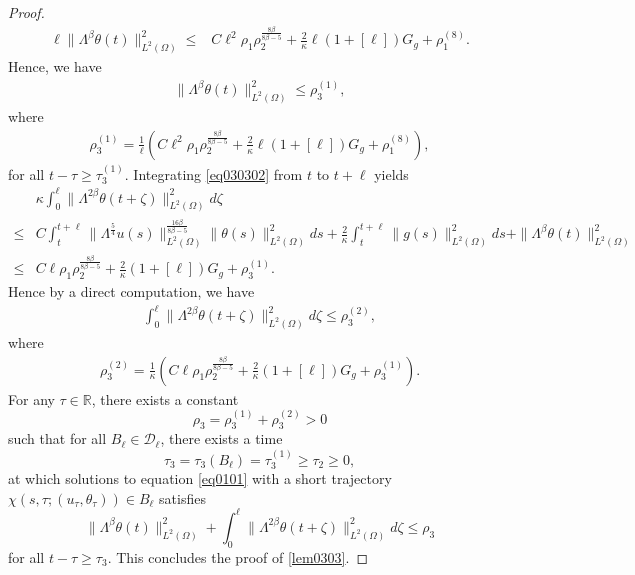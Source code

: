 \documentclass[oneside,preprint,12pt,numbers,sort&compress]{elsarticle}
\begin{document}
\begin{proof}
\begin{align*}
  \ell\|\Lambda^{\beta}\theta(t)\|_{L^2(\Omega)}^2 
  \leq&C\ell^{2}\rho_{1}\rho_{2}^{\frac{8\beta}{8\beta-5}}
  +\frac{2}{\kappa}\ell(1+[\ell])G_{g} +\rho_{1}^{(8)}.
\end{align*}
Hence, we have 
\begin{align}\label{eq030305}
  \|\Lambda^{\beta}\theta(t)\|_{L^2(\Omega)}^2 
  \leq \rho_{3}^{(1)},
\end{align}
where
\begin{align*}
  \rho_{3}^{(1)}
  =
  \frac{1}{\ell}
  \left( C\ell^{2}\rho_{1}\rho_{2}^{\frac{8\beta}{8\beta-5}}
  +\frac{2}{\kappa}\ell(1+[\ell])G_{g} +\rho_{1}^{(8)}
  \right),
\end{align*}
for all $t-\tau \geq \tau_{3}^{(1)}$.
Integrating \cref{eq030302} from $t$ to $t+\ell$ yields
\begin{align*}
  & \kappa\int_{0}^{\ell}\|\Lambda^{2\beta} \theta(t+\zeta)\|_{L^2(\Omega)}^2 d\zeta \\
  \leq & C
  \int_{t}^{t+\ell}
   \|\Lambda^{\frac{5}{4}}u(s)\|_{L^{2}(\Omega)}^{\frac{16\beta}{8\beta-5}}
   \|\theta(s)\|_{L^{2}(\Omega)}^{2} ds
   +\frac{2}{\kappa}
   \int_{t}^{t+\ell}\|g(s)\|_{L^2(\Omega)}^{2} ds
   +\|\Lambda^{\beta}\theta(t)\|_{L^2(\Omega)}^2 \\
  \leq & C \ell
  \rho_{1}\rho_{2}^{\frac{8\beta}{8\beta-5}}
   +\frac{2}{\kappa}(1+[\ell])G_{g} 
   +\rho_{3}^{(1)}.
\end{align*}
Hence by a direct computation, we have
\begin{align}\label{eq030306}
 \int_{0}^{\ell}\|\Lambda^{2\beta} \theta(t+\zeta)\|_{L^2(\Omega)}^2 d\zeta \leq \rho_{3}^{(2)},
\end{align}
where
\begin{align*}
   \rho_{3}^{(2)} = \frac{1}{\kappa} \left( C \ell
  \rho_{1}\rho_{2}^{\frac{8\beta}{8\beta-5}}
   +\frac{2}{\kappa}(1+[\ell])G_{g} 
   +\rho_{3}^{(1)} \right).
\end{align*}
For any $\tau \in \mathbb{R}$, there exists a constant 
$$
\rho_3=\rho_{3}^{(1)}+\rho_{3}^{(2)}>0
$$
such that for all $B_{\ell} \in \mathcal{D}_{\ell}$, there exists a time 
$$
\tau_3 =\tau_3(B_{\ell})=\tau_{3}^{(1)} \geq \tau_{2}\geq 0 ,
$$
at which solutions to equation \cref{eq0101} with a short trajectory $\chi(s,\tau; (u_\tau, \theta_\tau)) \in B_{\ell}$ satisfies 
\[
\| \Lambda^{\beta} \theta(t)\|_{L^2(\Omega)}^{2}
+ \int_{0}^{\ell} \| \Lambda^{2\beta} \theta(t+\zeta) \|_{L^2(\Omega)}^{2} d\zeta 
\leq \rho_3
\]
for all $t-\tau \geq \tau_3$. This concludes the proof of \cref{lem0303}.
\end{proof}
\end{document}
